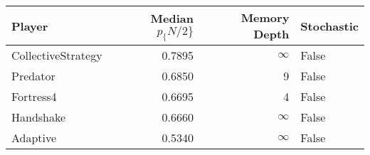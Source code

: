 \begin{tabular}{lrrl}
\toprule
             Player &  Median $p_\{N/2\}$ &  Memory Depth & Stochastic \\
\midrule
 CollectiveStrategy &            0.7895 &            \(\infty\) &      False \\
           Predator &            0.6850 &             9 &      False \\
          Fortress4 &            0.6695 &             4 &      False \\
          Handshake &            0.6660 &            \(\infty\) &      False \\
           Adaptive &            0.5340 &            \(\infty\) &      False \\
\bottomrule
\end{tabular}
